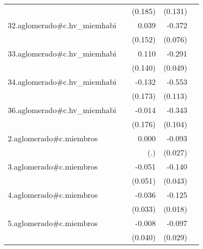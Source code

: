 {\begin{longtable}{l*{4}{D{.}{.}{-1}}}
            &                     &     (0.185)         &     (0.131)         &                     \\
\addlinespace
32.aglomerado#c.hv\_miemhabi&                     &       0.039         &      -0.372\sym{***}&                     \\
            &                     &     (0.152)         &     (0.076)         &                     \\
\addlinespace
33.aglomerado#c.hv\_miemhabi&                     &       0.110         &      -0.291\sym{***}&                     \\
            &                     &     (0.140)         &     (0.049)         &                     \\
\addlinespace
34.aglomerado#c.hv\_miemhabi&                     &      -0.132         &      -0.553\sym{***}&                     \\
            &                     &     (0.173)         &     (0.113)         &                     \\
\addlinespace
36.aglomerado#c.hv\_miemhabi&                     &      -0.014         &      -0.343\sym{**} &                     \\
            &                     &     (0.176)         &     (0.104)         &                     \\
\addlinespace
2.aglomerado#c.miembros&                     &       0.000         &      -0.093\sym{***}&                     \\
            &                     &         (.)         &     (0.027)         &                     \\
\addlinespace
3.aglomerado#c.miembros&                     &      -0.051         &      -0.140\sym{**} &                     \\
            &                     &     (0.051)         &     (0.043)         &                     \\
\addlinespace
4.aglomerado#c.miembros&                     &      -0.036         &      -0.125\sym{***}&                     \\
            &                     &     (0.033)         &     (0.018)         &                     \\
\addlinespace
5.aglomerado#c.miembros&                     &      -0.008         &      -0.097\sym{***}&                     \\
            &                     &     (0.040)         &     (0.029)         &                     \\

\end{longtable}}
